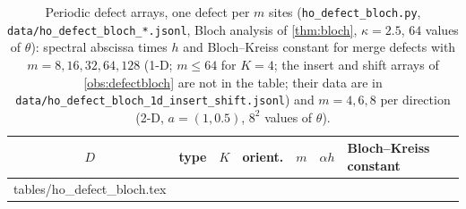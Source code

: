 \documentclass[11pt,a4paper]{article}
\makeatletter
\theoremstyle{plain}
\theoremstyle{definition}
\theoremstyle{remark}
\numberwithin{equation}{section}
\newcommand{\inputrows}[1]{\@@input #1 }%
\makeatother
\begin{document}
\begin{table}[t]
\centering
\caption{Periodic defect arrays, one defect per $m$ sites (\texttt{ho\_defect\_bloch.py}, \texttt{data/ho\_defect\_bloch\_*.jsonl}, Bloch analysis of \cref{thm:bloch}, $\kappa=2.5$, $64$ values of $\theta$): spectral abscissa times $h$ and Bloch--Kreiss constant for merge defects with $m=8,16,32,64,128$ (1-D; $m\le64$ for $K=4$; the insert and shift arrays of \cref{obs:defectbloch} are not in the table; their data are in \texttt{data/ho\_defect\_bloch\_1d\_insert\_shift.jsonl}) and $m=4,6,8$ per direction (2-D, $a=(1,0.5)$, $8^2$ values of $\theta$).}\label{tab:defectbloch}
\scriptsize
\begin{tabular}{ccccl>{\raggedright}p{5.4cm}>{\raggedright\arraybackslash}p{4.2cm}}
\toprule
$D$ & type & $K$ & orient. & $m$ & $\alpha h$ & Bloch--Kreiss constant\\
\midrule
\inputrows{tables/ho_defect_bloch.tex}
\bottomrule
\end{tabular}
\end{table}
\end{document}
